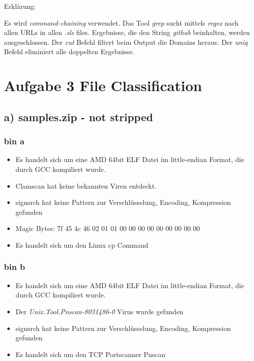 Erklärung:

Es wird \textit{command-chaining} verwendet.
Das Tool \textit{grep} sucht mittels \textit{regex} nach allen URLs in allen \textit{.sls} files.
Ergebnisse, die den String \textit{github} beinhalten, werden ausgeschlossen.
Der \textit{cut} Befehl filtert beim Output die Domains heraus.
Der \textit{uniq} Befehl eliminiert alle doppelten Ergebnisse.

\section*{Aufgabe 3 File Classification}

\subsection*{a) samples.zip - not stripped}

\subsubsection*{bin a}

\begin{itemize}
    \item Es handelt sich um eine AMD 64bit ELF Datei im little-endian Format, die durch GCC kompiliert wurde.
    \item Clamscan hat keine bekannten Viren entdeckt.
    \item signsrch hat keine Pattern zur Verschlüsselung, Encoding, Kompression gefunden
    \item Magic Bytes: 7f 45 4c 46 02 01 01 00 00 00 00 00 00 00 00 00
    \item Es handelt sich um den Linux cp Command
\end{itemize}

\subsubsection*{bin b}

\begin{itemize}
    \item Es handelt sich um eine AMD 64bit ELF Datei im little-endian Format, die durch GCC kompiliert wurde.
    \item Der \textit{Unix.Tool.Pnscan-8031486-0} Virus wurde gefunden
    \item signsrch hat keine Pattern zur Verschlüsselung, Encoding, Kompression gefunden
    \item Es handelt sich um den TCP Portscanner Pnscan
\end{itemize}

